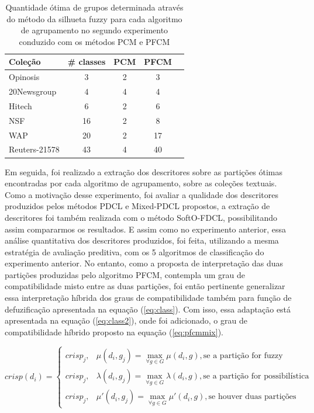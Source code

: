 \begin{table}[!htp]
  \centering
  \begin{tabular}{ |l|c|c|c|c|}
    \hline
    {\bf Coleção} & {\bf \# classes} & {\bf PCM} & {\bf PFCM} \\
    \hline
    Opinosis & 3 & 2 & 3 \\
    \hline
    20Newsgroup & 4 & 4 & 4 \\
    \hline
    Hitech & 6 & 2 & 6 \\
    \hline
    NSF & 16 &  2 & 8 \\
    \hline
    WAP & 20 & 2 & 17 \\
    \hline
    Reuters-21578 & 43 & 4 & 40 \\
    \hline
  \end{tabular}
  \caption{Quantidade ótima de grupos determinada através do método da silhueta fuzzy para cada
  algoritmo de agrupamento no segundo experimento conduzido com os métodos PCM e PFCM}
  \label{table:pfcmclusters}
\end{table}

Em seguida, foi realizado a extração dos descritores sobre as partições ótimas encontradas por
cada algoritmo de agrupamento, sobre as coleções textuais. Como a motivação desse experimento, foi
avaliar a qualidade dos descritores produzidos pelos métodos PDCL e Mixed-PDCL propostos, a extração
de descritores foi também realizada com o método SoftO-FDCL, possibilitando assim compararmos os
resultados. E assim como no experimento anterior, essa análise quantitativa dos descritores
produzidos, foi feita, utilizando a mesma estratégia de avaliação preditiva,
com os 5 algoritmos de classificação do experimento anterior. No entanto, como a proposta de
interpretação das duas partições produzidas pelo algoritmo PFCM, contempla um grau de
compatibilidade misto entre as duas partições, foi então pertinente generalizar essa interpretação
híbrida dos graus de compatibilidade também para função de defuzificação apresentada na equação
(\ref{eq:class}). Com isso, essa adaptação está apresentada na equação (\ref{eq:class2}), onde 
foi adicionado, o grau de compatibilidade híbrido proposto na equação (\ref{eq:pfcmmix}).

\begin{equation}
  crisp(d_i) = \begin{cases}
    crisp_j, & \mu(d_i,g_j) = \displaystyle\max_{\forall g \in G} \mu(d_i,g), \text{se a partição
  for fuzzy}\\
  crisp_j, & \lambda(d_i,g_j) = \displaystyle\max_{\forall g \in G} \lambda(d_i,g), \text{se a
  partição for possibilística}\\
  crisp_j, & \mu'(d_i,g_j) = \displaystyle\max_{\forall g \in G} \mu'(d_i,g), \text{se houver
duas partições}
  \end{cases}
  \label{eq:class2}
\end{equation}


